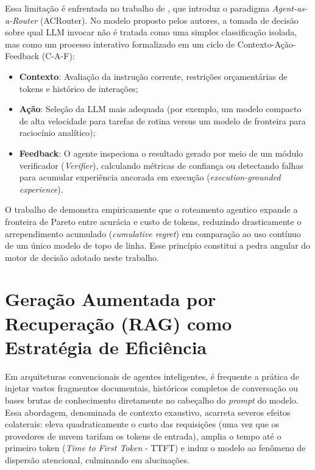 Essa limitação é enfrentada no trabalho de , que introduz o paradigma \textit{Agent-as-a-Router} (ACRouter). No modelo proposto pelos autores, a tomada de decisão sobre qual LLM invocar não é tratada como uma simples classificação isolada, mas como um processo interativo formalizado em um ciclo de Contexto-Ação-Feedback (C-A-F):

\begin{itemize}
    \item \textbf{Contexto}: Avaliação da instrução corrente, restrições orçamentárias de tokens e histórico de interações;
    \item \textbf{Ação}: Seleção da LLM mais adequada (por exemplo, um modelo compacto de alta velocidade para tarefas de rotina versus um modelo de fronteira para raciocínio analítico);
    \item \textbf{Feedback}: O agente inspeciona o resultado gerado por meio de um módulo verificador (\textit{Verifier}), calculando métricas de confiança ou detectando falhas para acumular experiência ancorada em execução (\textit{execution-grounded experience}).
\end{itemize}

O trabalho de  demonstra empiricamente que o roteamento agentico expande a fronteira de Pareto entre acurácia e custo de tokens, reduzindo drasticamente o arrependimento acumulado (\textit{cumulative regret}) em comparação ao uso contínuo de um único modelo de topo de linha. Esse princípio constitui a pedra angular do motor de decisão adotado neste trabalho.

\section{Geração Aumentada por Recuperação (RAG) como Estratégia de Eficiência}

Em arquiteturas convencionais de agentes inteligentes, é frequente a prática de injetar vastos fragmentos documentais, históricos completos de conversação ou bases brutas de conhecimento diretamente no cabeçalho do \textit{prompt} do modelo. Essa abordagem, denominada de contexto exaustivo, acarreta severos efeitos colaterais: eleva quadraticamente o custo das requisições (uma vez que os provedores de nuvem tarifam os tokens de entrada), amplia o tempo até o primeiro token (\textit{Time to First Token} - TTFT) e induz o modelo ao fenômeno de dispersão atencional, culminando em alucinações.

